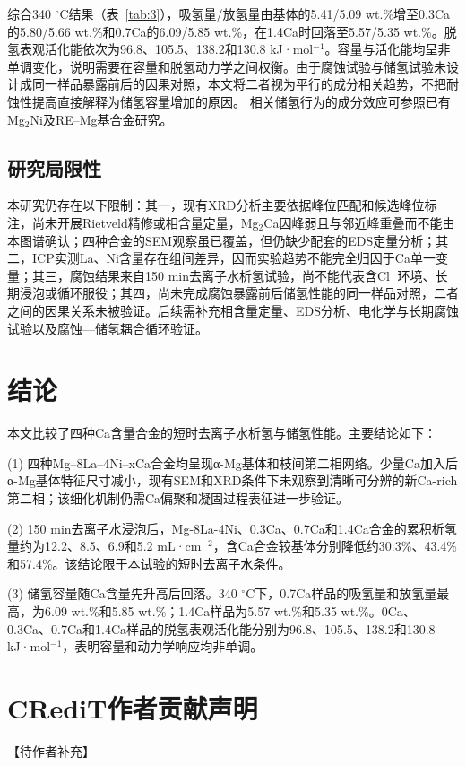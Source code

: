 \documentclass[preprint,12pt]{elsarticle}
\begin{document}
综合340 $^\circ$C结果（表~\ref{tab:3}），吸氢量/放氢量由基体的5.41/5.09 wt.\%增至0.3Ca的5.80/5.66 wt.\%和0.7Ca的6.09/5.85 wt.\%，在1.4Ca时回落至5.57/5.35 wt.\%。脱氢表观活化能依次为96.8、105.5、138.2和130.8 kJ·mol$^{-1}$。容量与活化能均呈非单调变化，说明需要在容量和脱氢动力学之间权衡。由于腐蚀试验与储氢试验未设计成同一样品暴露前后的因果对照，本文将二者视为平行的成分相关趋势，不把耐蚀性提高直接解释为储氢容量增加的原因。 相关储氢行为的成分效应可参照已有Mg$_2$Ni及RE–Mg基合金研究\cite{ref14,ref15}。

\subsection{研究局限性}

本研究仍存在以下限制：其一，现有XRD分析主要依据峰位匹配和候选峰位标注，尚未开展Rietveld精修或相含量定量，Mg$_2$Ca因峰弱且与邻近峰重叠而不能由本图谱确认；四种合金的SEM观察虽已覆盖，但仍缺少配套的EDS定量分析；其二，ICP实测La、Ni含量存在组间差异，因而实验趋势不能完全归因于Ca单一变量；其三，腐蚀结果来自150 min去离子水析氢试验，尚不能代表含Cl$^-$环境、长期浸泡或循环服役；其四，尚未完成腐蚀暴露前后储氢性能的同一样品对照，二者之间的因果关系未被验证。后续需补充相含量定量、EDS分析、电化学与长期腐蚀试验以及腐蚀—储氢耦合循环验证。

\section{结论}

本文比较了四种Ca含量合金的短时去离子水析氢与储氢性能。主要结论如下：

\noindent (1) 四种Mg--8La--4Ni--xCa合金均呈现α-Mg基体和枝间第二相网络。少量Ca加入后α-Mg基体特征尺寸减小，现有SEM和XRD条件下未观察到清晰可分辨的新Ca-rich第二相；该细化机制仍需Ca偏聚和凝固过程表征进一步验证。

\noindent (2) 150 min去离子水浸泡后，Mg-8La-4Ni、0.3Ca、0.7Ca和1.4Ca合金的累积析氢量约为12.2、8.5、6.9和5.2 mL·cm$^{-2}$，含Ca合金较基体分别降低约30.3\%、43.4\%和57.4\%。该结论限于本试验的短时去离子水条件。

\noindent (3) 储氢容量随Ca含量先升高后回落。340 $^\circ$C下，0.7Ca样品的吸氢量和放氢量最高，为6.09 wt.\%和5.85 wt.\%；1.4Ca样品为5.57 wt.\%和5.35 wt.\%。0Ca、0.3Ca、0.7Ca和1.4Ca样品的脱氢表观活化能分别为96.8、105.5、138.2和130.8 kJ·mol$^{-1}$，表明容量和动力学响应均非单调。

\section*{CRediT作者贡献声明}
【待作者补充】
\end{document}
